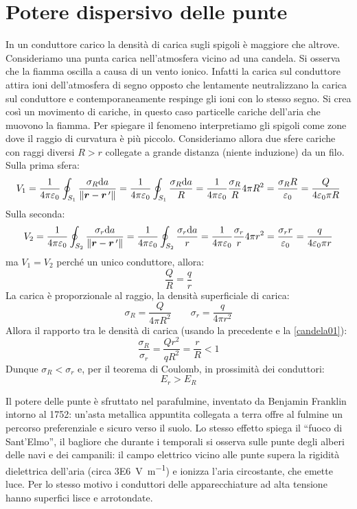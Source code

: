 \section{Potere dispersivo delle punte}
In un conduttore carico la densità di carica sugli spigoli è maggiore che altrove. Consideriamo una punta carica nell'atmosfera vicino ad una candela. Si osserva che la fiamma oscilla a causa di un vento ionico. Infatti la carica sul conduttore attira ioni dell'atmosfera di segno opposto che lentamente neutralizzano la carica sul conduttore e contemporaneamente respinge gli ioni con lo stesso segno. Si crea così un movimento di cariche, in questo caso particelle cariche dell'aria che muovono la fiamma. Per spiegare il fenomeno interpretiamo gli spigoli come zone dove il raggio di curvatura è più piccolo. Consideriamo allora due sfere cariche con raggi diversi $R>r$ collegate a grande distanza (niente induzione) da un filo. Sulla prima sfera:
\[V_1=\frac{1}{4\pi\varepsilon_0}\oint_{S_1}\frac{\sigma_R\mathrm{d} a}{\left\lVert\boldsymbol{r}-\boldsymbol{r}\,'\right\rVert}=\frac{1}{4\pi\varepsilon_0}\oint_{S_1}\frac{\sigma_R\mathrm{d} a}{R}=\frac{1}{4\pi\varepsilon_0}\frac{\sigma_R}{R}4\pi R^2=\frac{\sigma_R R}{\varepsilon_0}=\frac{Q}{4\varepsilon_0\pi R}\]
Sulla seconda:
\[V_2=\frac{1}{4\pi\varepsilon_0}\oint_{S_2}\frac{\sigma_r\mathrm{d} a}{\left\lVert\boldsymbol{r}-\boldsymbol{r}\,'\right\rVert}=\frac{1}{4\pi\varepsilon_0}\oint_{S_2}\frac{\sigma_r\mathrm{d} a}{r}=\frac{1}{4\pi\varepsilon_0}\frac{\sigma_r}{r}4\pi r^2=\frac{\sigma_r r}{\varepsilon_0}=\frac{q}{4\varepsilon_0\pi r}\]
ma $V_1=V_2$ perché un unico conduttore, allora:
\begin{equation}
  \frac{Q}{R}=\frac{q}{r}
  \label{candela01}
\end{equation}
La carica è proporzionale al raggio, la densità superficiale di carica:
\[\sigma_R=\frac{Q}{4\pi R^2}\qquad \sigma_r=\frac{q}{4\pi r^2}\]
Allora il rapporto tra le densità di carica (usando la precedente e la \eqref{candela01}):
\[\frac{\sigma_R}{\sigma_r}=\frac{Qr^2}{qR^2}=\frac{r}{R}<1\]
Dunque $\sigma_R<\sigma_r$ e, per il teorema di Coulomb, in prossimità dei conduttori:
\[E_r>E_R\]
\begin{Es}
  Il potere delle punte è sfruttato nel parafulmine, inventato da Benjamin Franklin intorno al 1752: un'asta metallica appuntita collegata a terra offre al fulmine un percorso preferenziale e sicuro verso il suolo. Lo stesso effetto spiega il ``fuoco di Sant'Elmo'', il bagliore che durante i temporali si osserva sulle punte degli alberi delle navi e dei campanili: il campo elettrico vicino alle punte supera la rigidità dielettrica dell'aria (circa \SI{3E6}{\volt\per\meter}) e ionizza l'aria circostante, che emette luce. Per lo stesso motivo i conduttori delle apparecchiature ad alta tensione hanno superfici lisce e arrotondate.
\end{Es}
